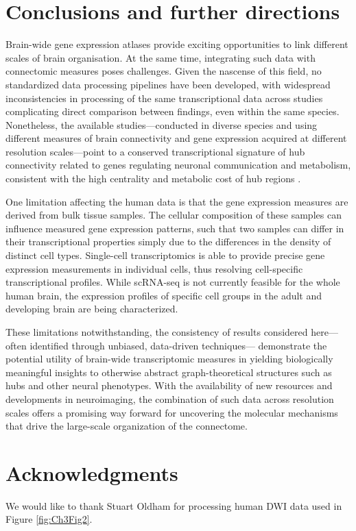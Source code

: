 \section{Conclusions and further directions}

Brain-wide gene expression atlases provide exciting opportunities to link different scales of brain organisation. At the same time, integrating such data with connectomic measures poses challenges. Given the nascense of this field, no standardized data processing pipelines have been developed, with widespread inconsistencies in processing of the same transcriptional data across studies \citep{Arnatkeviciute2019} complicating direct comparison between findings, even within the same species. Nonetheless, the available studies---conducted in diverse species and using different measures of brain connectivity and gene expression acquired at different resolution scales---point to a conserved transcriptional signature of hub connectivity related to genes regulating neuronal communication and metabolism, consistent with the high centrality and metabolic cost of hub regions \citep{Bullmore2009}.

One limitation affecting the human data is that the gene expression measures are derived from bulk tissue samples. The cellular composition of these samples can influence measured gene expression patterns, such that two samples can differ in their transcriptional properties simply due to the differences in the density of distinct cell types. Single-cell transcriptomics is able to provide precise gene expression measurements in individual cells, thus resolving cell-specific transcriptional profiles. While scRNA-seq is not currently feasible for the whole human brain, the expression profiles of specific cell groups in the adult \citep{Johnson2015a,Hu2017,Picardi2017} and developing brain \citep{Zhong2018} are being characterized. 

These limitations notwithstanding, the consistency of results considered here---often identified through unbiased, data-driven techniques--- demonstrate the potential utility of brain-wide transcriptomic measures in yielding biologically meaningful insights to otherwise abstract graph-theoretical structures such as hubs and other neural phenotypes. With the availability of new resources and developments in neuroimaging, the combination of such data across resolution scales offers a promising way forward for uncovering the molecular mechanisms that drive the large-scale organization of the connectome.

\section*{Acknowledgments}

We would like to thank Stuart Oldham for processing human DWI data used in Figure \ref{fig:Ch3Fig2}. 
